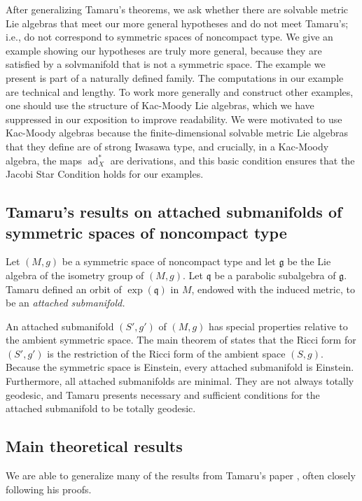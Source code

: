 \documentclass[12pt]{amsart}
\newcommand{\frakg}{\ensuremath{\mathfrak{g}} }
\newcommand{\frakq}{\ensuremath{\mathfrak{q}} }
\newcommand\ad{\operatorname{ad}}
\theoremstyle{plain}
\theoremstyle{definition}
\theoremstyle{remark}
\numberwithin{equation}{section}
\numberwithin{theorem}{section}
\begin{document}
After generalizing Tamaru's theorems, we ask whether there are 
solvable metric Lie algebras that meet our more general hypotheses and do not meet 
Tamaru's; i.e., do not correspond to symmetric spaces of noncompact type.  We give an
example showing our hypotheses are truly more general, because they are  satisfied by a
solvmanifold that is not a symmetric space. The example we present  is part of a
naturally defined family.   The computations in our example are 
technical and lengthy.  To work more generally and construct  other 
examples, one should  use the structure of 
Kac-Moody Lie algebras, which we have suppressed in our exposition 
to improve readability.
We were motivated to use Kac-Moody algebras because the finite-dimensional solvable
metric Lie algebras  that they define are of strong Iwasawa type, and crucially,  in a
Kac-Moody algebra, the maps $\ad_X^\ast$ are derivations, and this basic condition 
ensures that the Jacobi Star Condition holds for our examples.  

\subsection{Tamaru's results on attached submanifolds of symmetric spaces of noncompact type}

 Let  $(M,g)$ be a symmetric space of noncompact type  and let  $\frakg$ be the Lie
 algebra of the isometry group of $(M,g).$  Let $\frakq$ be a parabolic subalgebra of
 $\frakg$.  Tamaru defined an  orbit of $\exp(\frakq)$ in $M$, endowed with the induced
 metric,   to be an {\em attached submanifold.}  

 An attached submanifold $(S',g')$ of  $(M,g)$  has special properties relative to the ambient  symmetric space.   The main theorem of \cite{tamaru-11} states that the Ricci  form for $(S',g')$  is the 
restriction of the Ricci form of the ambient space  $(S,g)$.     Because the symmetric space is Einstein,  every attached submanifold  is Einstein.  
Furthermore, all attached submanifolds are minimal.  They are not always totally geodesic, and Tamaru presents necessary and sufficient conditions for the attached submanifold to be totally geodesic. 

\subsection{Main theoretical results}\label{Main results}

We are able to generalize  many 
of the results from Tamaru's paper 
\cite{tamaru-11}, often closely following his proofs.
\end{document}
